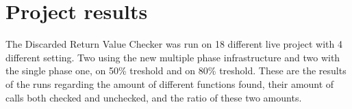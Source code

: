 \chapter{Project results}
\label{appx:diagrams}

The Discarded Return Value Checker was run on 18 different live project with 4 different setting. Two using the new
multiple phase infrastructure and two with the single phase one, on 50\% treshold and on 80\% treshold. These are
the results of the runs regarding the amount of different functions found, their amount of calls both checked and unchecked,
and the ratio of these two amounts.
\pagebreak

\begin{figure}[H]
\end{figure}

\begin{figure}[H]
\end{figure}

